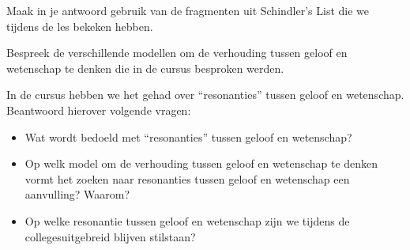 \documentclass[main.tex]{subfiles}
\begin{document}
\begin{examenvraag}
    \begin{vraag}
        Maak in je antwoord gebruik van de fragmenten uit Schindler’s List die we tijdens de les bekeken hebben.
    \end{vraag}

    \begin{antwoord}
    \end{antwoord}
\end{examenvraag}


\begin{examenvraag}
    \begin{vraag}
        Bespreek de verschillende modellen om de verhouding tussen geloof en wetenschap te denken die in de cursus besproken werden.
    \end{vraag}

    \begin{antwoord}
    \end{antwoord}
\end{examenvraag}


\begin{examenvraag}
    \begin{vraag}
        In de cursus hebben we het gehad over “resonanties” tussen geloof en wetenschap. Beantwoord hierover volgende vragen:
        \begin{itemize}
            \item Wat wordt bedoeld met “resonanties” tussen geloof en wetenschap?
            \item Op welk model om de verhouding tussen geloof en wetenschap te denken vormt het zoeken naar resonanties tussen geloof en wetenschap een aanvulling? Waarom?
            \item Op welke resonantie tussen geloof en wetenschap zijn we tijdens de collegesuitgebreid blijven stilstaan?
        \end{itemize}
    \end{vraag}

    \begin{antwoord}
    \end{antwoord}
\end{examenvraag}
\end{document}
